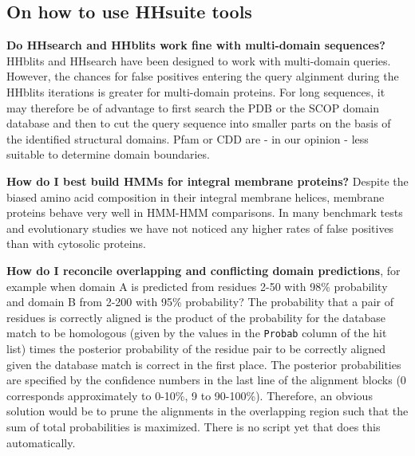 \documentclass[11pt,a4paper]{article}
\begin{document}
\subsection{On how to use HHsuite tools}

{\bf Do HHsearch and HHblits work fine with multi-domain sequences?}
HHblits and HHsearch have been designed to work with multi-domain queries. However, the chances for false positives entering the query alginment during the HHblits iterations is greater for multi-domain proteins. For long sequences, it may therefore be of advantage to first search the PDB or the SCOP domain database and then to cut the query sequence into smaller parts on the basis of the identified structural domains. Pfam or CDD are - in our opinion - less suitable to determine domain boundaries.

{\bf How do I best build HMMs for integral membrane proteins?}
Despite the biased amino acid composition in their integral membrane helices, membrane proteins behave very well in HMM-HMM comparisons. In many benchmark tests and evolutionary studies we have not noticed any higher rates of false positives than with cytosolic proteins. 

{\bf How do I reconcile overlapping and conflicting domain predictions}, for example when domain A is predicted from residues 2-50 with 98\% probability and domain B from 2-200 with 95\% probability? The probability that a pair of residues is correctly aligned is the product of the probability for the database match to be homologous (given by the values in the \verb`Probab` column of the hit list) times the posterior probability of the residue pair to be correctly aligned given the database match is correct in the first place. The posterior probabilities are specified by the confidence numbers in the last line of the alignment blocks (0 corresponds approximately to 0-10\%, 9 to 90-100\%). Therefore, an obvious solution would be to prune the alignments in the overlapping region such that the sum of total probabilities is maximized. There is no script yet that does this automatically.
\end{document}
